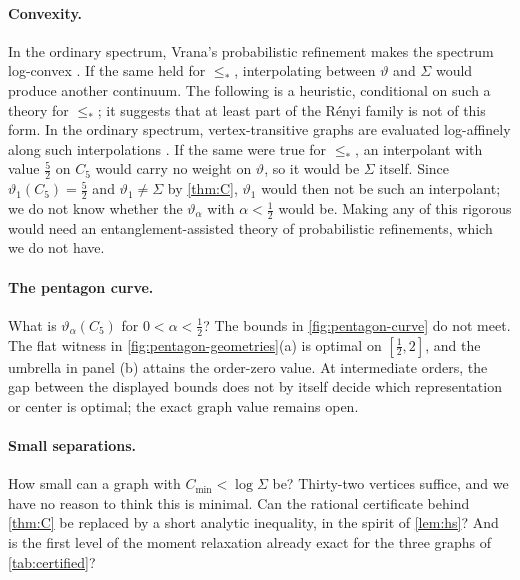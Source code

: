 \documentclass[11pt]{article}
\theoremstyle{definition}
\newcommand{\vt}{\vartheta}
\newcommand{\Cmin}{C_{\min}}
\begin{document}
\paragraph{Convexity.}
In the ordinary spectrum, Vrana's probabilistic refinement makes the spectrum
log-convex \cite{Vrana2021}.  If the same held for $\le_*$, interpolating
between $\vt$ and $\Sigma$ would produce another continuum.  The following is
a heuristic, conditional on such a theory for $\le_*$; it suggests that at
least part of the R\'enyi family is not of this form.  In the ordinary
spectrum, vertex-transitive graphs are evaluated log-affinely along such
interpolations \cite[Section~5]{Vrana2022}.  If the same were true for
$\le_*$, an interpolant with value $\frac52$ on $C_5$ would carry no weight on
$\vt$, so it would be $\Sigma$ itself.  Since $\vt_1(C_5)=\frac52$ and
$\vt_1\ne\Sigma$ by \cref{thm:C}, $\vt_1$ would then not be such an
interpolant; we do not know whether the $\vt_\alpha$ with $\alpha<\frac12$
would be.  Making any of this rigorous would need an entanglement-assisted
theory of probabilistic refinements, which we do not have.

\paragraph{The pentagon curve.}
What is $\vt_\alpha(C_5)$ for $0<\alpha<\frac12$?  The bounds in
\cref{fig:pentagon-curve} do not meet.  The flat witness in
\cref{fig:pentagon-geometries}(a) is optimal on $[\frac12,2]$, and the
umbrella in panel (b) attains the order-zero value.  At intermediate orders,
the gap between the displayed bounds does not by itself decide which
representation or center is optimal; the exact graph value remains open.

\paragraph{Small separations.}
How small can a graph with $\Cmin<\log\Sigma$ be?  Thirty-two vertices
suffice, and we have no reason to think this is minimal.  Can the rational
certificate behind \cref{thm:C} be replaced by a short analytic inequality,
in the spirit of \cref{lem:hs}?  And is the first level of the moment
relaxation already exact for the three graphs of \cref{tab:certified}?
\end{document}
